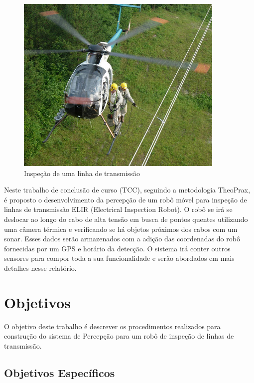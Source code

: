 \begin{figure}[!ht]
	\centering
	\includegraphics[width=10cm]{Figures/lineinpection.jpg}
	\caption{Inspeção de uma linha de transmissão} \label{lineinspection}
\end{figure}

Neste trabalho de conclusão de curso (TCC), seguindo a metodologia TheoPrax, é proposto o desenvolvimento da percepção de um robô móvel para inspeção de linhas de transmissão ELIR (Electrical Inspection Robot). O robô se irá se deslocar ao longo do cabo de alta tensão em busca de pontos quentes utilizando uma câmera térmica e verificando se há objetos próximos dos cabos com um sonar. Esses dados serão armazenados com a adição das coordenadas do robô fornecidas por um GPS e horário da detecção. O sistema irá conter outros sensores para compor toda a sua funcionalidade e serão abordados em mais detalhes nesse relatório.


\section{Objetivos}
\label{sec:obj}


O objetivo deste trabalho é descrever os procedimentos realizados para construção do sistema de Percepção para um robô de inspeção de linhas de transmissão.  


\subsection{Objetivos Específicos}
\label{ssec:objesp}

